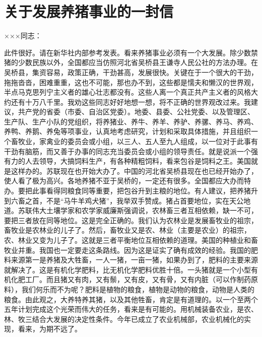\section[关于发展养猪事业的一封信（一九五九年十月十一日）]{关于发展养猪事业的一封信}


×××同志：

此件很好。请在新华社内部参考发表。看来养猪事业必须有一个大发展。除少数禁猪的少数民族以外，全国都应当仿照河北省吴桥县王谦寺人民公社的方法办理。在吴桥县，集资容易，政策正确，干劲甚高，发展很快。关键在于一个很大的干劲，拖拖沓沓，困难重重，这也不可能，那也办不到，这些都是懦夫和懒汉的世界观，半点马克思列宁主义者的雄心壮志都没有。这些人离一个真正共产主义者的风格大约还有十万八千里。我劝这些同志好好地想一想，将不正确的世界观改过来。我建议，共产党的省委（市委、自治区党委）。地委、县委、公社党委、以及管理区、生产队、生产小队的党组织，将养猪业、养牛、养羊、养驴、养骡、养马、养鸡、养鸭、养鹅、养兔等项事业，认真地考虑研究，计划和采取具体措施，并且组织一个畜牧业，家禽业的委员会或小组，以三人、五人至九人组成，以一位对于此事有干劲有脑筋，而又善于办事的同志充当委员会或小组的领导责任。就是说派一个强有力的人去领导，大搞饲料生产，有各种精粗饲料，看来包谷是饲料之王。美国就是这样办的。苏联现在也开始大办了。中国的河北省吴桥县现在也已经开始办了，使人看了极为高兴。各地养猪不亚于吴桥的，一定还有很多。全国都应大办而特办。要把此事看得同粮食同等重要，把包谷升到主粮的地位。有人建议，把养猪升到六畜之首，不是“马牛羊鸡犬猪”，我举双手赞成。猪占首要地位，实在天公地道。苏联伟大土壤学家和农学家威廉斯强调说，农林畜三者互相依赖，缺一不可，要把三者放在同等地位。这是完全正确的。我们认为农林业是发展畜牧业的祖宗，畜牧业是农林业的儿子了。然后，畜牧业又是农、林业（主要是农业）的祖宗，农、林业又变为儿子了。这就是三者平衡地位互相依赖的道理。美国的种植业和畜牧业并重。我国也一定要走这条路线。因为这是证实了确有成效的经验。我国的肥料来源第一是养猪及大牲畜，一人一猪，一亩一猪，如果办到了，肥料的主要来源就解决了。这是有机化学肥料，比无机化学肥料优胜十倍。一头猪就是一个小型有机化肥工厂。而且猪又有肉，又有鬃，又有皮，又有骨，又有内脏（可以作制药原料），我们何乐而不为呢？肥料是植物的粮食，植物是动物的粮食，动物是人类的粮食。由此观之，大养特养其猪，以及其他牲畜，肯定是有道理的。以一个至两个五年计划完成这个光荣而伟大的任务，看来是有可能的。用机械装备农业，是农、林、牧三结合大发展的决定性条件。今年已成立了农业机械部，农业机械化的实现，看来，为期不远了。


